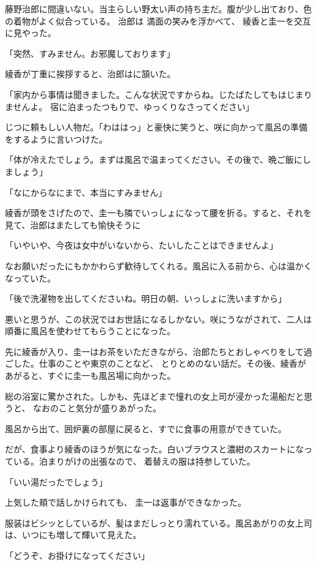﻿\documentclass[book,tate]{jlreq}
\begin{document}
藤野治郎に間違いない。当主らしい野太い声の持ち主だ。腹が少し出ており、色の着物がよく似合っている。
治郎は 満面の笑みを浮かべて、 綾香と圭一を交互に見やった。

「突然、すみません。お邪魔しております」

綾香が丁重に挨拶すると、治郎はに頷いた。

「家内から事情は聞きました。こんな状況ですからね。じたばたしてもはじまりませんよ。
宿に泊まったつもりで、ゆっくりなさってください」

じつに頼もしい人物だ。「わははっ」と豪快に笑うと、咲に向かって風呂の準備をするように言いつけた。

「体が冷えたでしょう。まずは風呂で温まってください。その後で、晩ご飯にしましょう」

「なにからなにまで、本当にすみません」

綾香が頭をさげたので、圭一も隣でいっしょになって腰を折る。すると、それを見て、治郎はまたしても愉快そうに

「いやいや、今夜は女中がいないから、たいしたことはできませんよ」

なお願いだったにもかかわらず歓待してくれる。風呂に入る前から、心は温かくなっていた。

「後で洗濯物を出してくださいね。明日の朝、いっしょに洗いますから」

悪いと思うが、この状況ではお世話になるしかない。咲にうながされて、二人は順番に風呂を使わせてもらうことになった。

先に綾香が入り、圭一はお茶をいただきながら、治郎たちとおしゃべりをして過ごした。仕事のことや東京のことなど、
とりとめのない話だ。その後、綾香があがると、すぐに圭一も風呂場に向かった。

総の浴室に驚かされた。しかも、先ほどまで憧れの女上司が浸かった湯船だと思うと、
なおのこと気分が盛りあがった。

風呂から出て、囲炉裏の部屋に戻ると、すでに食事の用意ができていた。

だが、食事より綾香のほうが気になった。白いブラウスと濃紺のスカートになっている。泊まりがけの出張なので、
着替えの服は持参していた。

「いい湯だったでしょう」

上気した頬で話しかけられても、 圭一は返事ができなかった。

服装はビシッとしているが、髪はまだしっとり濡れている。風呂あがりの女上司は、いつにも増して輝いて見えた。

「どうぞ、お掛けになってください」
\end{document}
